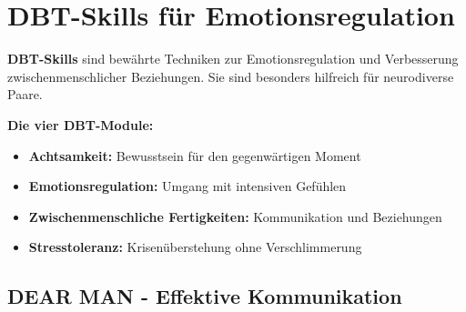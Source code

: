 
\section{DBT-Skills für Emotionsregulation}
\label{sec:dbt-skills}

\begin{ctmmBlueBox}[title=Dialektisch-Behaviorale Therapie (DBT) Skills]

\textbf{DBT-Skills} sind bewährte Techniken zur Emotionsregulation und Verbesserung zwischenmenschlicher Beziehungen. Sie sind besonders hilfreich für neurodiverse Paare.

\vspace{0.5em}

\textbf{Die vier DBT-Module:}
\begin{itemize}
    \item \textcolor{ctmmBlue}{\textbf{Achtsamkeit:}} Bewusstsein für den gegenwärtigen Moment
    \item \textcolor{ctmmGreen}{\textbf{Emotionsregulation:}} Umgang mit intensiven Gefühlen
    \item \textcolor{ctmmOrange}{\textbf{Zwischenmenschliche Fertigkeiten:}} Kommunikation und Beziehungen
    \item \textcolor{ctmmPurple}{\textbf{Stresstoleranz:}} Krisenüberstehung ohne Verschlimmerung
\end{itemize}

\end{ctmmBlueBox}

\subsection{DEAR MAN - Effektive Kommunikation}

